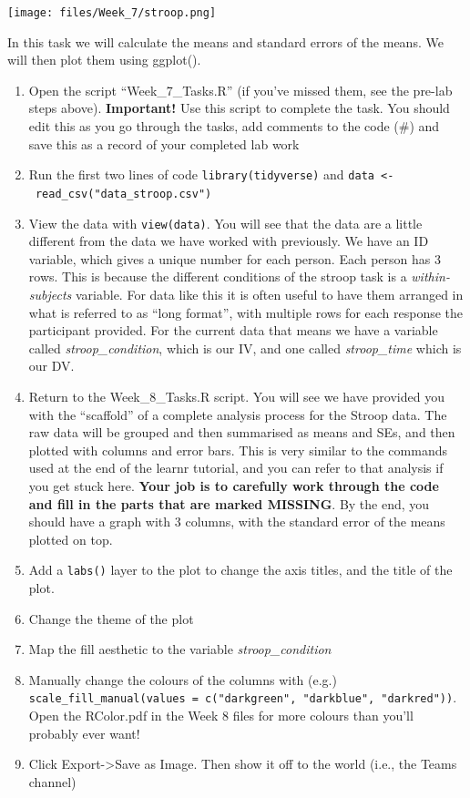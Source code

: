 \documentclass[
]{book}
\begin{document}
\texttt{[image: files/Week\_7/stroop.png]}

In this task we will calculate the means and standard errors of the means. We will then plot them using ggplot().

\begin{enumerate}
\def\labelenumi{\arabic{enumi}.}
\item
  Open the script ``Week\_7\_Tasks.R'' (if you've missed them, see the pre-lab steps above). \textbf{Important!} Use this script to complete the task. You should edit this as you go through the tasks, add comments to the code (\#) and save this as a record of your completed lab work
\item
  Run the first two lines of code \texttt{library(tidyverse)} and \texttt{data\ \textless{}-\ read\_csv("data\_stroop.csv")}
\item
  View the data with \texttt{view(data)}. You will see that the data are a little different from the data we have worked with previously. We have an ID variable, which gives a unique number for each person. Each person has 3 rows. This is because the different conditions of the stroop task is a \emph{within-subjects} variable. For data like this it is often useful to have them arranged in what is referred to as ``long format'', with multiple rows for each response the participant provided. For the current data that means we have a variable called \emph{stroop\_condition}, which is our IV, and one called \emph{stroop\_time} which is our DV.
\item
  Return to the Week\_8\_Tasks.R script. You will see we have provided you with the ``scaffold'' of a complete analysis process for the Stroop data. The raw data will be grouped and then summarised as means and SEs, and then plotted with columns and error bars. This is very similar to the commands used at the end of the learnr tutorial, and you can refer to that analysis if you get stuck here. \textbf{Your job is to carefully work through the code and fill in the parts that are marked MISSING}. By the end, you should have a graph with 3 columns, with the standard error of the means plotted on top.
\item
  Add a \texttt{labs()} layer to the plot to change the axis titles, and the title of the plot.
\item
  Change the theme of the plot
\item
  Map the fill aesthetic to the variable \emph{stroop\_condition}
\item
  Manually change the colours of the columns with (e.g.) \texttt{scale\_fill\_manual(values\ =\ c("darkgreen",\ "darkblue",\ "darkred"))}. Open the RColor.pdf in the Week 8 files for more colours than you'll probably ever want!
\item
  Click Export-\textgreater Save as Image. Then show it off to the world (i.e., the Teams channel)
\end{enumerate}
\end{document}
